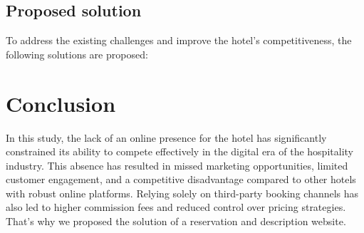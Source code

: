 \subsection{Proposed solution  }

To address the existing challenges and improve the hotel's competitiveness, the following solutions are proposed:

 
\section{Conclusion}
In this study,  the lack of an online presence for the hotel has significantly constrained its ability to compete effectively in the digital era of the hospitality industry. This absence has resulted in missed marketing opportunities, limited customer engagement, and a competitive disadvantage compared to other hotels with robust online platforms. Relying solely on third-party booking channels has also led to higher commission fees and reduced control over pricing strategies.
That's why we proposed the solution of a reservation and description website.